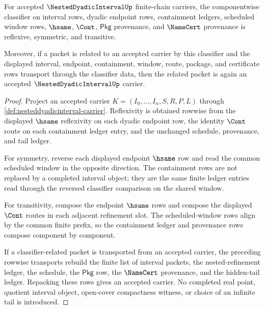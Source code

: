 \begin{theorem}
\label{thm:nesteddyadicinterval-classifier-laws}
For accepted $\NestedDyadicIntervalUp$ finite-chain carriers, the componentwise classifier on interval rows, dyadic endpoint rows, containment ledgers, scheduled window rows, $\hsame$, $\Cont$, $\mathsf{Pkg}$ provenance, and $\NameCert$ provenance is reflexive, symmetric, and transitive.

Moreover, if a packet is related to an accepted carrier by this classifier and the displayed interval, endpoint, containment, window, route, package, and certificate rows transport through the classifier data, then the related packet is again an accepted $\NestedDyadicIntervalUp$ carrier.
\end{theorem}
\begin{proof}
Project an accepted carrier $K=(I_0,\ldots,I_n,S,R,P,L)$ through \autoref{def:nesteddyadicinterval-carrier}. Reflexivity is obtained rowwise from the displayed $\hsame$ reflexivity on each dyadic endpoint row, the identity $\Cont$ route on each containment ledger entry, and the unchanged schedule, provenance, and tail ledger.

For symmetry, reverse each displayed endpoint $\hsame$ row and read the common scheduled window in the opposite direction. The containment rows are not replaced by a completed interval object; they are the same finite ledger entries read through the reversed classifier comparison on the shared window.

For transitivity, compose the endpoint $\hsame$ rows and compose the displayed $\Cont$ routes in each adjacent refinement slot. The scheduled-window rows align by the common finite prefix, so the containment ledger and provenance rows compose component by component.

If a classifier-related packet is transported from an accepted carrier, the preceding rowwise transports rebuild the finite list of interval packets, the nested-refinement ledger, the schedule, the $\mathsf{Pkg}$ row, the $\NameCert$ provenance, and the hidden-tail ledger. Repacking these rows gives an accepted carrier. No completed real point, quotient interval object, open-cover compactness witness, or choice of an infinite tail is introduced.
\end{proof}

